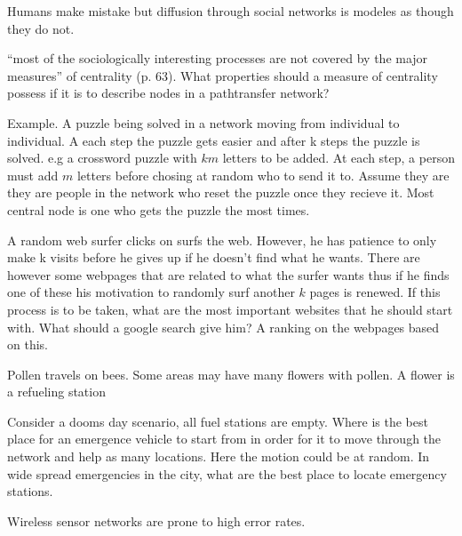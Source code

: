 \documentclass[envcountsame]{llncs}
\begin{document}
\citep{brashears2016error} Humans make mistake but diffusion through social networks is modeles as though they do not. 

\citep{tutzauer2007entropy} “most of the sociologically interesting processes are not covered by the major measures” of centrality (p. 63).
What properties should a measure of centrality possess if it is to describe nodes in a pathtransfer network?

Example. A puzzle being solved in a network moving from individual to individual. A each step the puzzle gets easier and after k steps the puzzle is solved. e.g a crossword puzzle with $km$ letters to be added. At each step, a person must add $m$ letters before chosing at random who to send it to. Assume they are they are people in the network who reset the puzzle once they recieve it. Most central node is one who gets the puzzle the most times. 

A random web surfer clicks on surfs the web. However, he has patience to only make k visits before he gives up if he doesn't find what he wants. There are however some webpages that are related to what the surfer wants thus if he finds one of these his motivation to randomly surf another $k$ pages is renewed. If this process is to be taken, what are the most important websites that he should start with. What should a google search give him? A ranking on the webpages based on this. 

Pollen travels on bees. Some areas may have many flowers with pollen. A flower is a refueling station

Consider a dooms day scenario, all fuel stations are empty. Where is the best place for an emergence vehicle to start from in order for it to move through the network and help as many locations. Here the motion could be at random. In wide spread emergencies in the city, what are the best place to locate emergency stations. 


\cite{akyildiz2002wireless} Wireless sensor networks are prone to high error rates. 
\end{document}
